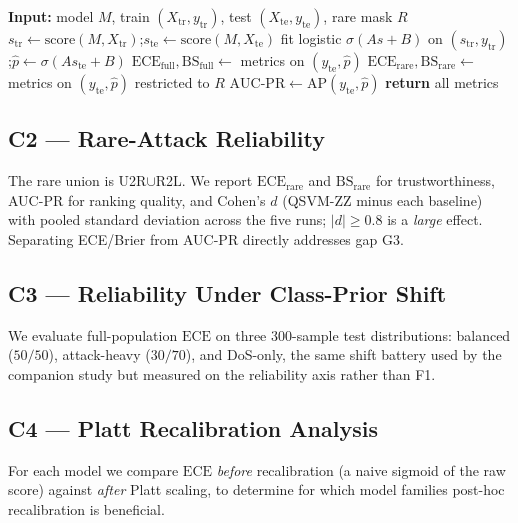 \documentclass[journal]{IEEEtran}
\newcommand{\ZZ}{\textsc{ZZ}}
\newcommand{\QSVM}{QSVM-\ZZ}
\newcommand{\ECE}{\mathrm{ECE}}
\newcommand{\Brier}{\mathrm{BS}}
\begin{document}
\begin{algorithm}[t]
\caption{Uniform Platt probability and reliability metrics}
\label{alg:platt}
\begin{algorithmic}[1]
\STATE \textbf{Input:} model $M$, train $(X_{\mathrm{tr}},y_{\mathrm{tr}})$, test $(X_{\mathrm{te}},y_{\mathrm{te}})$, rare mask $R$
\STATE $s_{\mathrm{tr}}\!\gets\!\mathrm{score}(M,X_{\mathrm{tr}})$;\quad $s_{\mathrm{te}}\!\gets\!\mathrm{score}(M,X_{\mathrm{te}})$
\STATE fit logistic $\sigma(As{+}B)$ on $(s_{\mathrm{tr}},y_{\mathrm{tr}})$;\quad $\hat{p}\!\gets\!\sigma(As_{\mathrm{te}}{+}B)$
\STATE $\ECE_{\mathrm{full}},\Brier_{\mathrm{full}}\!\gets\!$ metrics on $(y_{\mathrm{te}},\hat{p})$
\STATE $\ECE_{\mathrm{rare}},\Brier_{\mathrm{rare}}\!\gets\!$ metrics on $(y_{\mathrm{te}},\hat{p})$ restricted to $R$
\STATE $\mathrm{AUC\text{-}PR}\!\gets\!\mathrm{AP}(y_{\mathrm{te}},\hat{p})$
\STATE \textbf{return} all metrics
\end{algorithmic}
\end{algorithm}

\subsection{C2 --- Rare-Attack Reliability}
The rare union is U2R$\cup$R2L. We report $\ECE_{\text{rare}}$ and
$\Brier_{\text{rare}}$ for trustworthiness, AUC-PR for ranking quality,
and Cohen's $d$ (\QSVM{} minus each baseline) with pooled standard
deviation across the five runs; $|d|\ge0.8$ is a \emph{large} effect.
Separating ECE/Brier from AUC-PR directly addresses gap G3.

\subsection{C3 --- Reliability Under Class-Prior Shift}
We evaluate full-population $\ECE$ on three $300$-sample test
distributions: balanced ($50/50$), attack-heavy ($30/70$), and
DoS-only, the same shift battery used by the companion study but measured
on the reliability axis rather than F1.

\subsection{C4 --- Platt Recalibration Analysis}
For each model we compare $\ECE$ \emph{before} recalibration (a naive
sigmoid of the raw score) against \emph{after} Platt scaling, to
determine for which model families post-hoc recalibration is beneficial.
\end{document}
